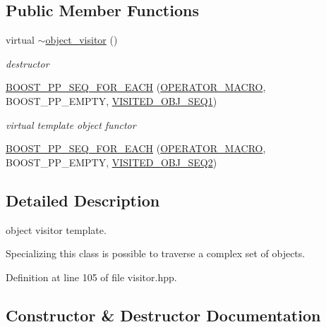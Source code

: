 \subsection*{Public Member Functions}
\begin{DoxyCompactItemize}
\item 
virtual \hyperlink{classobject__visitor_a02523317c24979b23ee7d59ab6c513ba}{$\sim$object\+\_\+visitor} ()
\begin{DoxyCompactList}\small\item\em destructor \end{DoxyCompactList}\item 
\hyperlink{classobject__visitor_a8989fde00dd4d9857903436e5b020d46}{B\+O\+O\+S\+T\+\_\+\+P\+P\+\_\+\+S\+E\+Q\+\_\+\+F\+O\+R\+\_\+\+E\+A\+CH} (\hyperlink{visitor_8hpp_a824d794626a77855112081a5d90bd4bd}{O\+P\+E\+R\+A\+T\+O\+R\+\_\+\+M\+A\+C\+RO}, B\+O\+O\+S\+T\+\_\+\+P\+P\+\_\+\+E\+M\+P\+TY, \hyperlink{tree__node_8hpp_aabebe0f1b0926f2961275b6b0e7b0fff}{V\+I\+S\+I\+T\+E\+D\+\_\+\+O\+B\+J\+\_\+\+S\+E\+Q1})
\begin{DoxyCompactList}\small\item\em virtual template object functor \end{DoxyCompactList}\item 
\hyperlink{classobject__visitor_a79fea0e804a753cf9af6fdf8cd0459ce}{B\+O\+O\+S\+T\+\_\+\+P\+P\+\_\+\+S\+E\+Q\+\_\+\+F\+O\+R\+\_\+\+E\+A\+CH} (\hyperlink{visitor_8hpp_a824d794626a77855112081a5d90bd4bd}{O\+P\+E\+R\+A\+T\+O\+R\+\_\+\+M\+A\+C\+RO}, B\+O\+O\+S\+T\+\_\+\+P\+P\+\_\+\+E\+M\+P\+TY, \hyperlink{tree__node_8hpp_aba1e488d3cf28336c0003e537659cba0}{V\+I\+S\+I\+T\+E\+D\+\_\+\+O\+B\+J\+\_\+\+S\+E\+Q2})
\end{DoxyCompactItemize}


\subsection{Detailed Description}
object visitor template. 

Specializing this class is possible to traverse a complex set of objects. 

Definition at line 105 of file visitor.\+hpp.



\subsection{Constructor \& Destructor Documentation}
\mbox{\label{classobject__visitor_a02523317c24979b23ee7d59ab6c513ba}} 

